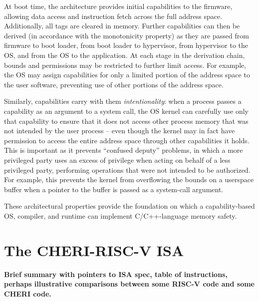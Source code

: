 \documentclass[12pt,twoside,openright,a4paper]{article}
\newcommand{\note}[2]{{\color{blue}[ Note: #1 - #2]}}
\renewcommand{\note}[2]{\relax\ifhmode\unskip\fi}
\newcommand{\rwnote}[1]{\note{#1}{Robert W.}}
\newcommand{\pgnnote}[1]{\note{#1}{Peter N.}}
\begin{document}
At boot time, the architecture provides initial capabilities to the firmware,
allowing data access and instruction fetch across the full address space.
Additionally, all tags are cleared in memory.
Further capabilities can then be derived (in accordance with the monotonicity
property) as they are passed from firmware to boot loader, from boot loader to
hypervisor, from hypervisor to the OS, and from the OS to the application.
At each stage in the derivation chain, bounds and permissions may be
restricted to further limit access.
For example, the OS may assign capabilities for only a limited portion of the
address space to the user software, preventing use of other portions of the
address space.



Similarly, capabilities carry with them \textit{intentionality}: when a
process passes a capability as an argument to a system call, the OS kernel can
carefully use only that capability to ensure that it does not access other
process memory that was not intended by the user process -- even though the
kernel may in fact have permission to access the entire address space through
other capabilities it holds.
This is important as it prevents ``confused deputy'' problems, in which a more
privileged party uses an excess of privilege when acting on behalf of a less
privileged party, performing operations that were not intended to be
authorized.
For example, this prevents the kernel from overflowing the bounds on a
userspace buffer when a pointer to the buffer is passed as a
system-call argument.

These architectural properties provide the foundation on which a
capability-based OS, compiler, and runtime can implement C/C++-language memory
safety.

\section{The CHERI-RISC-V ISA}

\textbf{Brief summary with pointers to ISA spec, table of instructions,
  perhaps illustrative comparisons between some RISC-V code and some CHERI
  code.}
\end{document}
